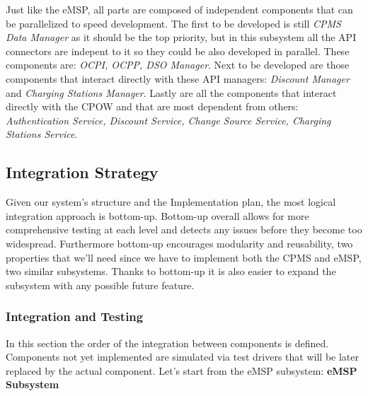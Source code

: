\documentclass[table, 12pt]{article}
\begin{document}
Just like the eMSP, all parts are composed of independent components that can be parallelized to speed development. The first to be developed is still \emph{CPMS Data Manager} as it should be the top priority,
but in this subsystem all the API connectors are indepent to it so they could be also developed in parallel. These components are: \emph{OCPI, OCPP, DSO Manager}.
Next to be developed are those components that interact directly with these API managers: \emph{Discount Manager} and \emph{Charging Stations Manager}. 
Lastly are all the components that interact directly with the CPOW and that are most dependent from others: \emph{Authentication Service, Discount Service, Change Source Service, Charging Stations Service}.


\subsection{Integration Strategy}
Given our system's structure and the Implementation plan, the most logical integration approach is bottom-up. Bottom-up overall allows for more comprehensive testing at each level and detects any issues before
they become too widespread. Furthermore bottom-up encourages modularity and reusability, two properties that we'll need since we have to implement both the CPMS and eMSP, two similar subsystems. Thanks to bottom-up 
it is also easier to expand the subsystem with any possible future feature.

\subsubsection{Integration and Testing}
In this section the order of the integration between components is defined. Components not yet implemented are simulated via test drivers that will be later replaced by the actual component.
Let's start from the eMSP subsystem:
\newpage
\textbf{eMSP Subsystem}
\end{document}
